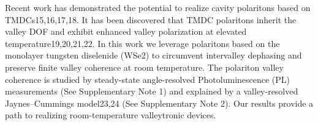 \documentclass[13pt]{article}
\begin{document}
	Recent work has demonstrated the potential to realize cavity polaritons based on TMDCs15,16,17,18. It has been discovered that TMDC polaritons inherit the valley DOF and exhibit enhanced valley polarization at elevated temperature19,20,21,22. In this work we leverage polaritons based on the monolayer tungsten diselenide (WSe2) to circumvent intervalley dephasing and preserve finite valley coherence at room temperature. The polariton valley coherence is studied by steady-state angle-resolved Photoluminescence (PL) measurements (See Supplementary Note 1) and explained by a valley-resolved Jaynes–Cummings model23,24 (See Supplementary Note 2). Our results provide a path to realizing room-temperature valleytronic devices.
\par 

\end{document}
